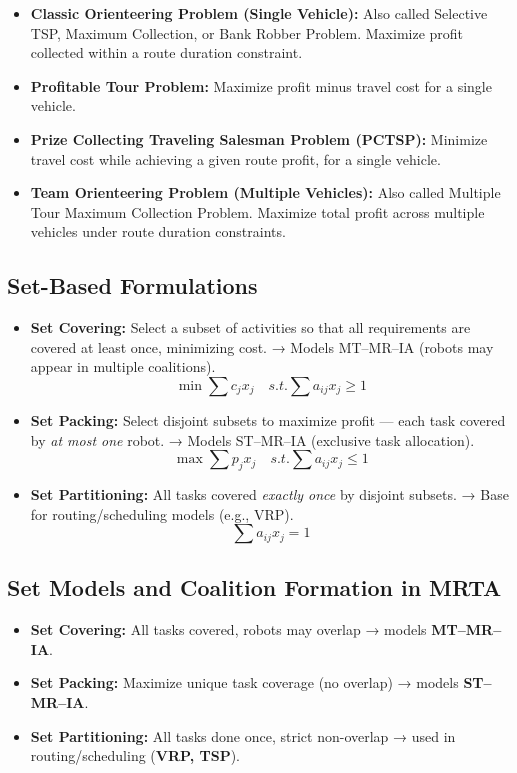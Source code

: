 \begin{itemize}
    \item \textbf{Classic Orienteering Problem (Single Vehicle):} Also called Selective TSP, Maximum Collection, or Bank Robber Problem. Maximize profit collected within a route duration constraint.

    \item \textbf{Profitable Tour Problem:} Maximize profit minus travel cost for a single vehicle.

    \item \textbf{Prize Collecting Traveling Salesman Problem (PCTSP):} Minimize travel cost while achieving a given route profit, for a single vehicle.

    \item \textbf{Team Orienteering Problem (Multiple Vehicles):} Also called Multiple Tour Maximum Collection Problem. Maximize total profit across multiple vehicles under route duration constraints.
\end{itemize}

\subsection*{Set-Based Formulations}
\begin{itemize}
    \item \textbf{Set Covering:} Select a subset of activities so that all requirements are covered at least once, minimizing cost.
    → Models MT–MR–IA (robots may appear in multiple coalitions).
    \[
    \min \sum c_j x_j \quad s.t. \sum a_{ij} x_j \ge 1
    \]

    \item \textbf{Set Packing:} Select disjoint subsets to maximize profit — each task covered by \textit{at most one} robot.
    → Models ST–MR–IA (exclusive task allocation).
    \[
    \max \sum p_j x_j \quad s.t. \sum a_{ij} x_j \le 1
    \]

    \item \textbf{Set Partitioning:} All tasks covered \textit{exactly once} by disjoint subsets.
    → Base for routing/scheduling models (e.g., VRP).
    \[
    \sum a_{ij} x_j = 1
    \]
\end{itemize}

\subsection*{Set Models and Coalition Formation in MRTA}
\begin{itemize}
    \item \textbf{Set Covering:} All tasks covered, robots may overlap → models \textbf{MT–MR–IA}.
    \item \textbf{Set Packing:} Maximize unique task coverage (no overlap) → models \textbf{ST–MR–IA}.
    \item \textbf{Set Partitioning:} All tasks done once, strict non-overlap → used in routing/scheduling (\textbf{VRP, TSP}).
\end{itemize}

